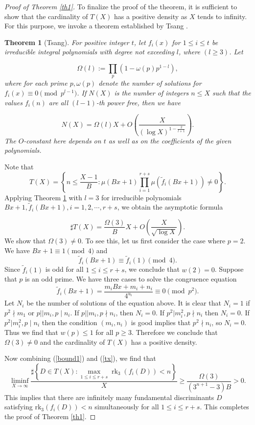 \documentclass{amsart}
\newtheorem{theorem}{Theorem}[section]
\begin{document}
\begin{proof}[Proof of Theorem \ref{th1}]
To finalize the proof of the theorem, it is sufficient to show that the cardinality of $T(X)$ has a positive density as $X$ tends to infinity.  For this purpose, we invoke a theorem established by  Tsang \cite{ts}.

\begin{theorem}[Tsang]\label{ts}
For positive integer $t$, let $f_{i}(x)$ for $1 \le i \le t$ be irreducible integral polynomials with degree not exceeding $l$, where $(l \geqslant 3)$. Let

\begin{equation}\label{omega}
\Omega(l):=\prod_{p}\left(1-\omega(p) p^{1-l}\right),
\end{equation}
where for each prime $p, \omega(p)$ denote the number of solutions for  $f_{i}(x)\equiv0\pmod{p^{l-1}}$. If $N(X)$ is the number of integers $n \le X$ such that the values $f_{i}(n)$ are all $(l-1)$-th power free, then we have

\[
N(X)=\Omega(l) X+O\left(\frac{X}{(\log X)^{ 1-\frac{2}{l+1}}}\right).
\]
The $O$-constant here depends on $t$ as well as on the coefficients of the given polynomials.
\end{theorem}

Note that
\[  T(X)= \left\{n \le \frac{X-1}{B}:  \mu(Bx+1)\prod_{i=1}^{r+s}\mu(\widetilde{f}_i(Bx+1)) \neq 0\right\}.
\]
Applying Theorem \ref{ts} with $l=3$ for irreducible polynomials $Bx+1, \widetilde{f}_i(Bx+1), i=1,2,\cdots,r+s$, we obtain the asymptotic formula

\begin{equation}\label{tx}
\sharp T(X)=\frac{\Omega(3)}{B} X+O\left(\frac{X}{\sqrt{\log X}}\right).
\end{equation}
We show that $\Omega(3)\neq 0$. To see this, let us first consider the case where
  $p=2$. We have $Bx+1\equiv1\pmod4$ and\[\widetilde{f}_i(Bx+1)\equiv\widetilde{f}_i(1)\pmod 4.\]
Since $\widetilde{f}_i(1)$ is odd for all $1\le i\le r+s$, we conclude that $w(2)=0$. Suppose that $p$ is an odd prime. We have three cases to solve the congruence equation
\[\widetilde{f}_i(Bx+1)=\frac{  m_{i} Bx+m_i+n_{i} }{4^{u_{i}}}\equiv0\pmod{p^2}.\]
Let $N_i$ be the number of solutions of the equation above. It is clear that $N_i=1$  if $p^2\nmid m_1$ or $p||m_i, p\mid n_i$. If $p||m_i, p\nmid n_i$, then  $N_i=0$. If $p^2|m_i^2, p\nmid n_i$ then $N_i=0$.  If $p^2|m_i^2, p\mid n_i$ then the condition $(m_i,n_i)$ is good implies that $p^2\nmid n_i$, so $N_i=0$. Thus we find that $w(p)\le 1$ for all $p\ge3$. Therefore we conclude that $\Omega(3)\neq 0$ and the cardinality of $ T(X)$ has a positive density.


Now combining  (\ref{bound1}) and (\ref{tx}), we find that
\[
\liminf _{X \rightarrow \infty} \frac{\sharp\left\{D \in T(X): \max _{1 \le i \le r+s} \operatorname{rk}_{3}\left({f_{i}(D)}\right)<n\right\}}{X} \geqslant \frac{\Omega(3)}{\left(3^{n+1}-3\right) B}>0.
\]
This implies that there are infinitely many fundamental discriminants $D$  satisfying $\mathrm{rk}_{3}\left({f_{i}(D)}\right)<n$ simultaneously for all $1 \le i \le r+s$. This completes the proof of Theorem \ref{th1}.
\end{proof}
\end{document}
